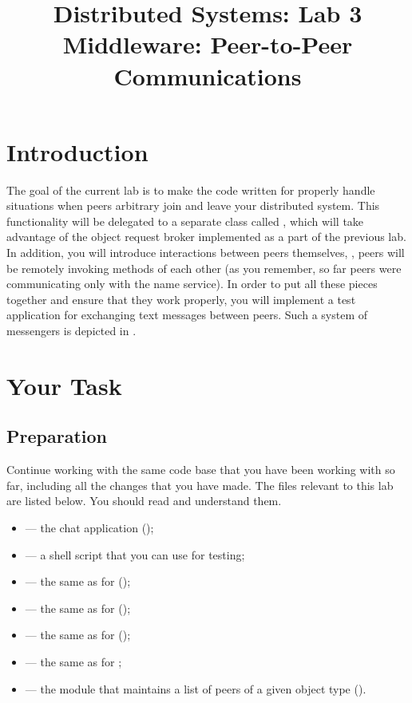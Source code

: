 \documentclass[a4paper]{article}
\title{%
  Distributed Systems: Lab 3\\%
  Middleware: Peer-to-Peer Communications%
}
\author{}
\date{}
\begin{document}
\maketitle

\section{Introduction}

The goal of the current lab is to make the code written for  properly
handle situations when peers arbitrary join and leave your distributed system.
This functionality will be delegated to a separate class called
, which will take advantage of the object request broker
implemented as a part of the previous lab. In addition, you will introduce
interactions between peers themselves, \ie, peers will be remotely invoking
methods \cite{lecture3} of each other (as you remember, so far peers were
communicating only with the name service). In order to put all these pieces
together and ensure that they work properly, you will implement a test
application for exchanging text messages between peers. Such a system of
messengers is depicted in .

\section{Your Task}
\subsection{Preparation}
Continue working with the same code base that you have been working with so far,
including all the changes that you have made. The files relevant to this lab are
listed below. You should read and understand them.
\begin{itemize}

  \item {} --- the chat application (\leave);

  \item {} --- a shell script that you can use for testing;

  \item {} --- the same as for
   (\leave);

  \item {} --- the same as for 
  (\overwrite);

  \item {} --- the same as for 
  (\overwrite);

  \item {} --- the same as for ;

  \item {} --- the module that maintains a
  list of peers of a given object type (\fix).

\end{itemize}
\end{document}
